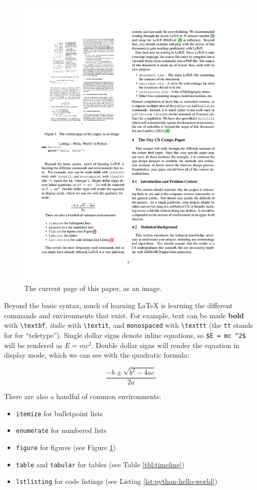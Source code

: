 \documentclass[10pt,twocolumn]{article}
\begin{document}
\begin{figure}
    \centering
    \includegraphics[width=.95\linewidth]{recursion.png}
    \caption{
        The current page of this paper, as an image.
    }
    \label{fig:first-page}
\end{figure}

Beyond the basic syntax, much of learning LaTeX is learning the different commands and environments that exist.
For example, text can be made \textbf{bold} with \texttt{\textbackslash textbf}, \textit{italic} with \texttt{\textbackslash textit}, and \texttt{monospaced} with \texttt{\textbackslash texttt} (the \texttt{tt} stands for for ``teletype'').
Single dollar signs denote inline equations, so \texttt{\$E = mc \textasciicircum 2\$} will be rendered as $E = mc^2$.
Double dollar signs will render the equation in display mode, which we can see with the quadratic formula:

$$\frac{{-b \pm \sqrt {b^2 - 4ac} }}{{2a}}$$

There are also a handful of common environments:

\begin{itemize}
    \item \texttt{itemize} for bulletpoint lists
    \item \texttt{enumerate} for numbered lists
    \item \texttt{figure} for figures (see Figure \ref{fig:first-page})
    \item \texttt{table} and \texttt{tabular} for tables (see Table \ref{tbl:timeline})
    \item \texttt{lstlisting} for code listings (see Listing \ref{lst:python-hello-world})
\end{itemize}
\end{document}
